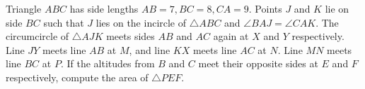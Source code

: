 Triangle $ABC$ has side lengths $AB=7,BC=8,CA=9$. Points $J$ and $K$ lie on side $BC$ such that $J$ lies on the incircle of $\triangle{ABC}$ and $\angle{BAJ}=\angle{CAK}$. The circumcircle of $\triangle{AJK}$ meets sides $AB$ and $AC$ again at $X$ and $Y$ respectively. Line $JY$ meets line $AB$ at $M$, and line $KX$ meets line $AC$ at $N$. Line $MN$ meets line $BC$ at $P$. If the altitudes from $B$ and $C$ meet their opposite sides at $E$ and $F$ respectively, compute the area of $\triangle{PEF}$.
